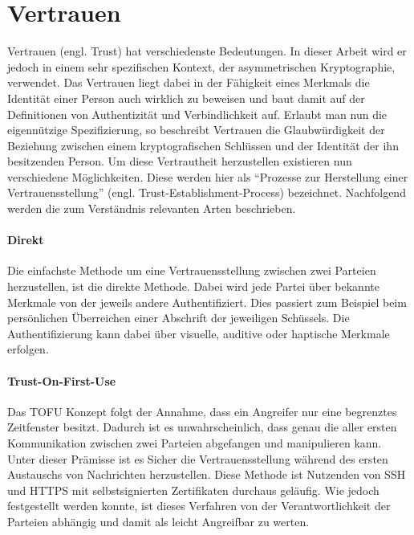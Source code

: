 \section{Vertrauen}
\label{sec:trust}
Vertrauen (engl. Trust) hat verschiedenste Bedeutungen. In dieser Arbeit wird er jedoch in einem sehr spezifischen Kontext, der asymmetrischen Kryptographie, verwendet. Das Vertrauen liegt dabei in der Fähigkeit eines Merkmals die Identität einer Person auch wirklich zu beweisen und baut damit auf der Definitionen von Authentizität und Verbindlichkeit auf\cite{Perrin2010}. Erlaubt man nun die eigennützige Spezifizierung, so beschreibt Vertrauen die Glaubwürdigkeit der Beziehung zwischen einem kryptografischen Schlüssen und der Identität der ihn besitzenden Person. Um diese Vertrautheit herzustellen existieren nun verschiedene Möglichkeiten. Diese werden hier als ``Prozesse zur Herstellung einer Vertrauensstellung'' (engl. Trust-Establishment-Process) bezeichnet. Nachfolgend werden die zum Verständnis relevanten Arten beschrieben.

\paragraph{Direkt}
Die einfachste Methode um eine Vertrauensstellung zwischen zwei Parteien herzustellen, ist die direkte Methode. Dabei wird jede Partei über bekannte Merkmale von der jeweils andere Authentifiziert. Dies passiert zum Beispiel beim persönlichen Überreichen einer Abschrift der jeweiligen Schüssels. Die Authentifizierung kann dabei über visuelle, auditive oder haptische Merkmale erfolgen.

\paragraph{Trust-On-First-Use}
Das \ac{TOFU} Konzept folgt der Annahme, dass ein Angreifer nur eine begrenztes Zeitfenster besitzt. Dadurch ist es unwahrscheinlich, dass genau die aller ersten Kommunikation zwischen zwei Parteien abgefangen und manipulieren kann. Unter dieser Prämisse ist es Sicher die Vertrauensstellung während des ersten Austauschs von Nachrichten herzustellen. Diese Methode ist Nutzenden von \ac{SSH} und \acs{HTTPS} mit selbstsignierten Zertifikaten durchaus geläufig. Wie jedoch festgestellt werden konnte, ist dieses Verfahren von der Verantwortlichkeit der Parteien abhängig und damit als leicht Angreifbar zu werten\cite{Wendlandt2008}.


